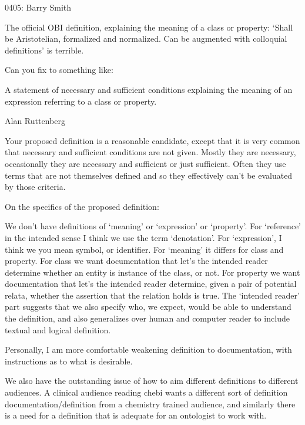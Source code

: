 \documentclass[letterpaper,10pt,english]{sphinxmanual}
\begin{document}
\begin{sphinxShadowBox}

\sphinxhyphen{}04\sphinxhyphen{}05:
Barry Smith

\sphinxAtStartPar
The official OBI definition, explaining the meaning of a class or property: ‘Shall be Aristotelian, formalized and normalized. Can be augmented with colloquial definitions’  is terrible.

\sphinxAtStartPar
Can you fix to something like:

\sphinxAtStartPar
A statement of necessary and sufficient conditions explaining the meaning of an expression referring to a class or property.

\sphinxAtStartPar
Alan Ruttenberg

\sphinxAtStartPar
Your proposed definition is a reasonable candidate, except that it is very common that necessary and sufficient conditions are not given. Mostly they are necessary, occasionally they are necessary and sufficient or just sufficient. Often they use terms that are not themselves defined and so they effectively can’t be evaluated by those criteria.

\sphinxAtStartPar
On the specifics of the proposed definition:

\sphinxAtStartPar
We don’t have definitions of ‘meaning’ or ‘expression’ or ‘property’. For ‘reference’ in the intended sense I think we use the term ‘denotation’. For ‘expression’, I think we you mean symbol, or identifier. For ‘meaning’ it differs for class and property. For class we want documentation that let’s the intended reader determine whether an entity is instance of the class, or not. For property we want documentation that let’s the intended reader determine, given a pair of potential relata, whether the assertion that the relation holds is true. The ‘intended reader’ part suggests that we also specify who, we expect, would be able to understand the definition, and also generalizes over human and computer reader to include textual and logical definition.

\sphinxAtStartPar
Personally, I am more comfortable weakening definition to documentation, with instructions as to what is desirable.

\sphinxAtStartPar
We also have the outstanding issue of how to aim different definitions to different audiences. A clinical audience reading chebi wants a different sort of definition documentation/definition from a chemistry trained audience, and similarly there is a need for a definition that is adequate for an ontologist to work with.
\end{sphinxShadowBox}
\end{document}
